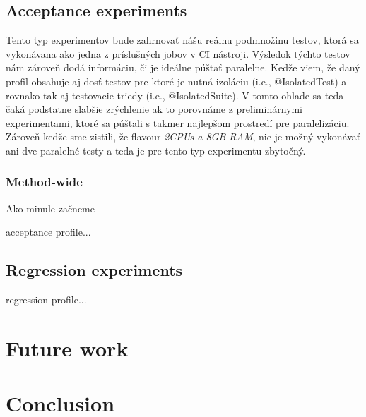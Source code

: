 \section{Acceptance experiments}

Tento typ experimentov bude zahrnovať nášu reálnu podmnožinu testov, ktorá sa vykonávana ako jedna z príslušných jobov v CI
nástroji. Výsledok týchto testov nám zároveň dodá informáciu, či je ideálne púštať paralelne. Kedže viem, že daný profil
obsahuje aj dosť testov pre ktoré je nutná izoláciu (i.e., @IsolatedTest) a rovnako tak aj testovacie triedy (i.e., @IsolatedSuite).
V tomto ohlade sa teda čaká podstatne slabšie zrýchlenie ak to porovnáme z preliminárnymi experimentami, ktoré sa púštali
s takmer najlepšom prostredí pre paralelizáciu. Zároveň kedže sme zistili, že flavour \emph{2CPUs a 8GB RAM}, nie je
možný vykonávať ani dve paralelné testy a teda je pre tento typ experimentu zbytočný.

\subsection{Method-wide}

Ako minule začneme

acceptance profile...

\section{Regression experiments}

regression profile...

\chapter{Future work}
\label{07:chapter:title}

\chapter{Conclusion}
\label{08:chapter:title}

